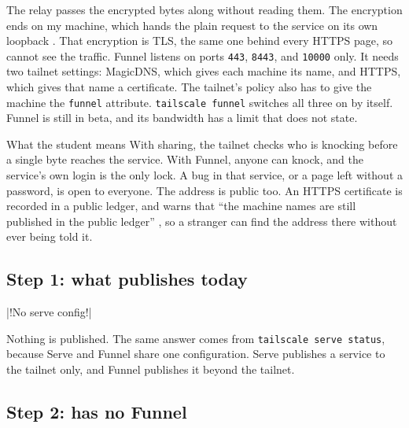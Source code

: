 \documentclass[11pt,a4paper]{article}
\renewcommand{\panetitle}{Shared pane 5.2, logged in to \name{AlfSPARK}}
\begin{document}
The relay passes the encrypted bytes along without reading them. The encryption ends on my machine, which hands the plain request to the service on its own loopback \cite{tsfunnel}. That encryption is TLS, the same one behind every HTTPS page, so  cannot see the traffic. Funnel listens on ports \texttt{443}, \texttt{8443}, and \texttt{10000} only. It needs two tailnet settings: MagicDNS, which gives each machine its name, and HTTPS, which gives that name a certificate. The tailnet's policy also has to give the machine the \texttt{funnel} attribute. \texttt{tailscale funnel} switches all three on by itself. Funnel is still in beta, and its bandwidth has a limit that  does not state.

\begin{insight}{What the student means}
With sharing, the tailnet checks who is knocking before a single byte reaches the service. With Funnel, anyone can knock, and the service's own login is the only lock. A bug in that service, or a page left without a password, is open to everyone. The address is public too. An HTTPS certificate is recorded in a public ledger, and  warns that “the machine names are still published in the public ledger” \cite{tshttps}, so a stranger can find the address there without ever being told it.
\end{insight}

\subsection*{Step 1: what  publishes today}

\renewcommand{\panetitle}{A shell on \name{AlfSPARK}}
\begin{cmdout}
|!No serve config!|
\end{cmdout}

Nothing is published. The same answer comes from \texttt{tailscale serve status}, because Serve and Funnel share one configuration. Serve publishes a service to the tailnet only, and Funnel publishes it beyond the tailnet.

\subsection*{Step 2:  has no Funnel}
\end{document}
